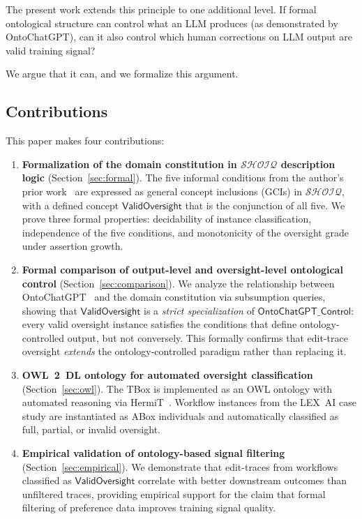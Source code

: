 \documentclass[11pt]{article}
\newcommand{\DL}{\ensuremath{\mathcal{SHOIQ}}\xspace}
\begin{document}
The present work extends this principle to one additional level.
If formal ontological structure can control what an LLM produces (as demonstrated by OntoChatGPT), can it also control which human corrections on LLM output are valid training signal?

We argue that it can, and we formalize this argument.

\subsection{Contributions}
\label{sec:contributions}

This paper makes four contributions:

\begin{enumerate}[label=(\arabic*),leftmargin=2em]

\item \textbf{Formalization of the domain constitution in \DL description logic} (Section~\ref{sec:formal}).
The five informal conditions from the author's prior work~\citep{ovcharov2025citation,ovcharov2025statute} are expressed as general concept inclusions (GCIs) in \DL, with a defined concept $\mathsf{ValidOversight}$ that is the conjunction of all five.
We prove three formal properties: decidability of instance classification, independence of the five conditions, and monotonicity of the oversight grade under assertion growth.

\item \textbf{Formal comparison of output-level and oversight-level ontological control} (Section~\ref{sec:comparison}).
We analyze the relationship between OntoChatGPT~\citep{palagin2023ontochatgpt} and the domain constitution via subsumption queries, showing that $\mathsf{ValidOversight}$ is a \emph{strict specialization} of $\mathsf{OntoChatGPT\_Control}$: every valid oversight instance satisfies the conditions that define ontology-controlled output, but not conversely.
This formally confirms that edit-trace oversight \emph{extends} the ontology-controlled paradigm rather than replacing it.

\item \textbf{OWL~2~DL ontology for automated oversight classification} (Section~\ref{sec:owl}).
The TBox is implemented as an OWL ontology with automated reasoning via HermiT~\citep{shearer2008hermit}.
Workflow instances from the LEX~AI case study are instantiated as ABox individuals and automatically classified as full, partial, or invalid oversight.

\item \textbf{Empirical validation of ontology-based signal filtering} (Section~\ref{sec:empirical}).
We demonstrate that edit-traces from workflows classified as $\mathsf{ValidOversight}$ correlate with better downstream outcomes than unfiltered traces, providing empirical support for the claim that formal filtering of preference data improves training signal quality.

\end{enumerate}
\end{document}
